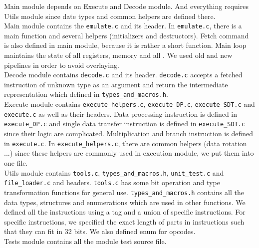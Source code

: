 \documentclass[11pt]{article}
\begin{document}
Main module depends on Execute and Decode module. And everything requires Utils module since date types and common helpers are defined there.\\

Main module contains the \texttt{emulate.c} and its header. In \texttt{emulate.c}, there is a main function and several helpers (initializers and destructors). Fetch command is also defined in main module, because it is rather a short function. Main loop maintains the state of all registers, memory and all . We used old and new pipelines in order to avoid overlaying.\\

Decode module contains \texttt{decode.c} and its header. \texttt{decode.c} accepts a fetched instruction of unknown type as an argument and return the intermediate representation which defined in \texttt{types\_and\_macros.h}.\\

Execute module contains \texttt{execute\_helpers.c}, \texttt{execute\_DP.c}, \texttt{execute\_SDT.c} and \texttt{execute.c} as well as their headers. Data processing instruction is defined in \texttt{execute\_DP.c} and single data transfer instruction is defined in \texttt{execute\_SDT.c} since their logic are complicated. Multiplication and branch instruction is defined in \texttt{execute.c}. In \texttt{execute\_helpers.c}, there are common helpers (data rotation ...) since these helpers are commonly used in execution module, we put them into one file.\\

Utils module contains \texttt{tools.c}, \texttt{types\_and\_macros.h}, \texttt{unit\_test.c} and \texttt{file\_loader.c} and headers. \texttt{tools.c} has some bit operation and type transformation functions for general use. \texttt{types\_and\_macros.h} contains all the data types, structures and enumerations which are used in other functions. We defined all the instructions using a tag and a union of specific instructions. For specific instructions, we specified the exact length of parts in instructions such that they can fit in 32 bits. We also defined enum for opcodes.\\

Tests module contains all the module test source file.\\
\end{document}
